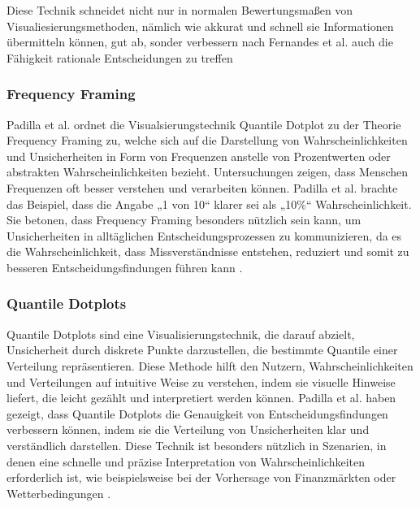 Diese Technik schneidet nicht nur in normalen Bewertungsmaßen 
von Visualiesierungsmethoden, nämlich wie akkurat und schnell sie Informationen übermitteln können, gut ab, sonder verbessern
nach Fernandes et al. auch die Fähigkeit rationale Entscheidungen zu treffen \cite{Fernandes2018}  


\subsubsection{Frequency Framing}
Padilla et al. ordnet die Visualsierungstechnik Quantile Dotplot zu der Theorie Frequency Framing zu, welche sich auf die Darstellung von Wahrscheinlichkeiten 
und Unsicherheiten in Form von Frequenzen anstelle von Prozentwerten oder abstrakten Wahrscheinlichkeiten bezieht. Untersuchungen zeigen, dass Menschen Frequenzen oft besser 
verstehen und verarbeiten können. Padilla et al. brachte das Beispiel, dass die Angabe „1 von 10“ klarer sei als „10\%“ Wahrscheinlichkeit. Sie
betonen, dass Frequency Framing besonders nützlich sein kann, um Unsicherheiten in alltäglichen Entscheidungsprozessen zu kommunizieren, 
da es die Wahrscheinlichkeit, dass Missverständnisse entstehen, reduziert und somit zu besseren Entscheidungsfindungen führen 
kann \cite{Padilla2021}.

\subsubsection{Quantile Dotplots}
Quantile Dotplots sind eine Visualisierungstechnik, die darauf abzielt, Unsicherheit durch diskrete Punkte darzustellen, 
die bestimmte Quantile einer Verteilung repräsentieren. Diese Methode hilft den Nutzern, Wahrscheinlichkeiten und Verteilungen 
auf intuitive Weise zu verstehen, indem sie visuelle Hinweise liefert, die leicht gezählt und interpretiert werden können. 
Padilla et al. haben gezeigt, dass Quantile Dotplots die Genauigkeit von Entscheidungsfindungen verbessern können, indem sie 
die Verteilung von Unsicherheiten klar und verständlich darstellen. Diese Technik ist besonders nützlich in Szenarien, in denen 
eine schnelle und präzise Interpretation von Wahrscheinlichkeiten erforderlich ist, wie beispielsweise bei der Vorhersage von 
Finanzmärkten oder Wetterbedingungen \cite{Padilla2021}.



